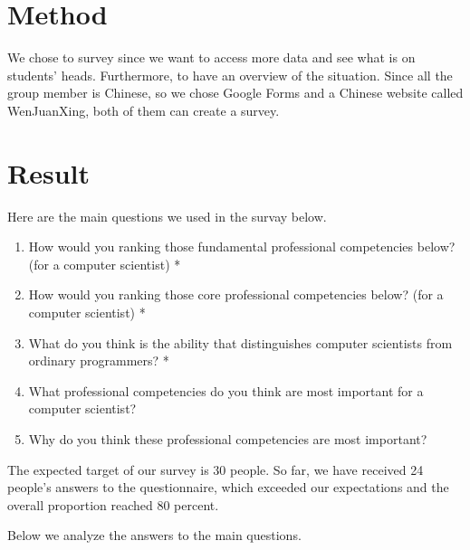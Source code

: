 \documentclass[conference]{IEEEtran}
\begin{document}
\section{Method}
We chose to survey since we want to access more data and see what is on students' heads. Furthermore, to have an overview of the situation.
Since all the group member is Chinese, so we chose Google Forms and a Chinese website called WenJuanXing, both of them can create a survey.

\section{Result}

Here are the main questions we used in the survay below.
\begin{enumerate}
    \item How would you ranking those fundamental professional competencies below?(for a computer scientist) *
    \item How would you ranking those core professional competencies below? (for a computer scientist) *
    \item What do you think is the ability that distinguishes computer scientists from ordinary programmers? *
    \item What professional competencies do you think are most important for a computer scientist?
    \item Why do you think these professional competencies are most important?
    
\end{enumerate}
\par The expected target of our survey is 30 people. So far, we have received 24 people’s answers to the questionnaire, which exceeded our expectations and the overall proportion reached 80 percent.
\par Below we analyze the answers to the main questions.
\end{document}
